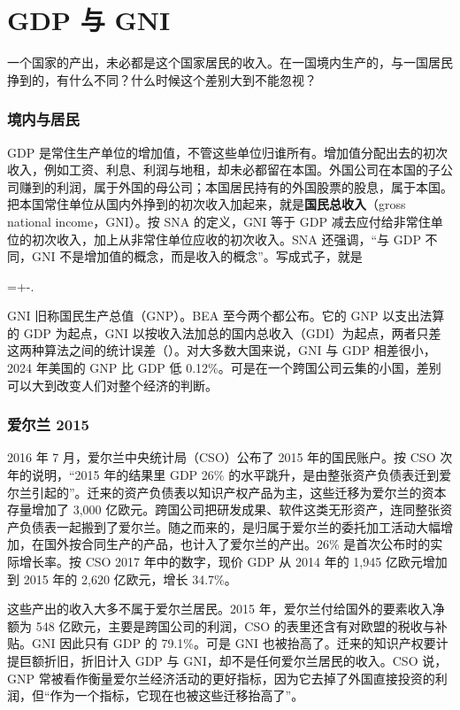 \section{GDP 与 GNI}\label{sec:accounts-gni}

一个国家的产出，未必都是这个国家居民的收入。在一国境内生产的，与一国居民挣到的，有什么不同？什么时候这个差别大到不能忽视？

\subsubsection{境内与居民}
GDP 是常住生产单位的增加值，不管这些单位归谁所有。增加值分配出去的初次收入，例如工资、利息、利润与地租，却未必都留在本国。外国公司在本国的子公司赚到的利润，属于外国的母公司；本国居民持有的外国股票的股息，属于本国。把本国常住单位从国内外挣到的初次收入加起来，就是\textbf{国民总收入}（gross national income，GNI）。按 SNA 的定义，GNI 等于 GDP 减去应付给非常住单位的初次收入，加上从非常住单位应收的初次收入。SNA 还强调，“与 GDP 不同，GNI 不是增加值的概念，而是收入的概念”\cite{sna2008}。写成式子，就是
\begin{keyeq}
=+-.\label{eq:accounts-gni}
\end{keyeq}
GNI 旧称国民生产总值（GNP）。BEA 至今两个都公布。它的 GNP 以支出法算的 GDP 为起点，GNI 以按收入法加总的国内总收入（GDI）为起点，两者只差这两种算法之间的统计误差（）。对大多数大国来说，GNI 与 GDP 相差很小，2024 年美国的 GNP 比 GDP 低 0.12\%\cite{bea2026}。可是在一个跨国公司云集的小国，差别可以大到改变人们对整个经济的判断。

\subsubsection{爱尔兰 2015}
2016 年 7 月，爱尔兰中央统计局（CSO）公布了 2015 年的国民账户。按 CSO 次年的说明，“2015 年的结果里 GDP 26\% 的水平跳升，是由整张资产负债表迁到爱尔兰引起的”\cite{cso2017}。迁来的资产负债表以知识产权产品为主，这些迁移为爱尔兰的资本存量增加了 3,000 亿欧元。跨国公司把研发成果、软件这类无形资产，连同整张资产负债表一起搬到了爱尔兰。随之而来的，是归属于爱尔兰的委托加工活动大幅增加，在国外按合同生产的产品，也计入了爱尔兰的产出\cite{cso2017}。26\% 是首次公布时的实际增长率。按 CSO 2017 年中的数字，现价 GDP 从 2014 年的 1,945 亿欧元增加到 2015 年的 2,620 亿欧元，增长 34.7\%\cite{cso2017}。

这些产出的收入大多不属于爱尔兰居民。2015 年，爱尔兰付给国外的要素收入净额为 548 亿欧元，主要是跨国公司的利润，CSO 的表里还含有对欧盟的税收与补贴。GNI 因此只有 GDP 的 79.1\%。可是 GNI 也被抬高了。迁来的知识产权要计提巨额折旧，折旧计入 GDP 与 GNI，却不是任何爱尔兰居民的收入。CSO 说，GNP 常被看作衡量爱尔兰经济活动的更好指标，因为它去掉了外国直接投资的利润，但“作为一个指标，它现在也被这些迁移抬高了”\cite{cso2017}。

